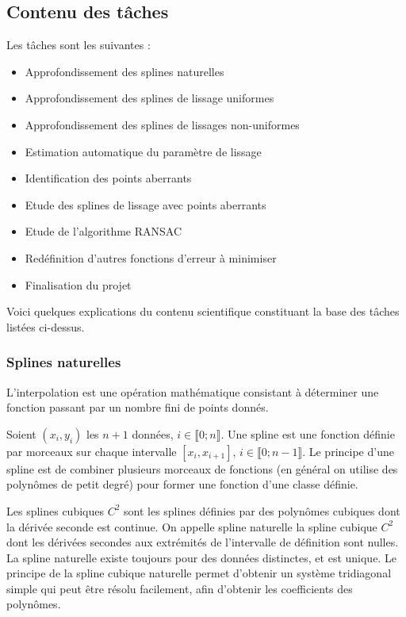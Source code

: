 \documentclass[a4paper,10pt]{article} %
\begin{document}
	\subsection{Contenu des tâches}
	Les tâches sont les suivantes :
\begin{itemize}
\item Approfondissement des splines naturelles
\item Approfondissement des splines de lissage uniformes
\item Approfondissement des splines de lissages non-uniformes
\item Estimation automatique du paramètre de lissage
\item Identification des points aberrants
\item Etude des splines de lissage avec points aberrants
\item Etude de l'algorithme RANSAC
\item Redéfinition d'autres fonctions d'erreur à minimiser
\item Finalisation du projet
\end{itemize}

Voici quelques explications du contenu scientifique constituant la base des tâches listées ci-dessus.
\subsubsection*{Splines naturelles}
L’interpolation est une opération mathématique consistant à déterminer une fonction passant par un nombre fini de points donnés.

Soient $(x_i,y_i)$ les $n+1$ données, $i\in\llbracket 0; n \rrbracket$.
Une spline est une fonction définie par morceaux sur chaque intervalle $[x_i, x_{i+1}]$, $i\in\llbracket 0; n-1 \rrbracket$.
Le principe d'une spline est de combiner plusieurs morceaux de fonctions (en général on utilise des polynômes de petit degré) pour former une fonction d'une classe définie.

Les splines cubiques $C^2$ sont les splines définies par des polynômes cubiques dont la dérivée seconde est continue. On appelle spline naturelle la spline cubique $C^2$ dont les dérivées secondes aux extrémités de l'intervalle de définition sont nulles. La spline naturelle existe toujours pour des données distinctes, et est unique. Le principe de la spline cubique naturelle permet d'obtenir un système tridiagonal simple qui peut être résolu facilement, afin d'obtenir les coefficients des polynômes.
\end{document}
